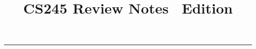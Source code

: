 \documentclass[12pt, twoside, exarticle]{article}
\title{\textbf{CS245 Review Notes \docbuild\ Edition}}
\begin{document}

\makeatletter
\hfil\parbox[t]{0.7\textwidth}{\centering\LARGE\bfseries\@title}\par
\kern0.5cm \hrule\kern0.5cm
\makeatother



\thispagestyle{empty}




\clearpage


\thispagestyle{empty}




\clearpage


\thispagestyle{empty}

\renewcommand{\contentsname}{Table of Contents}

\tableofcontents
\end{document}
